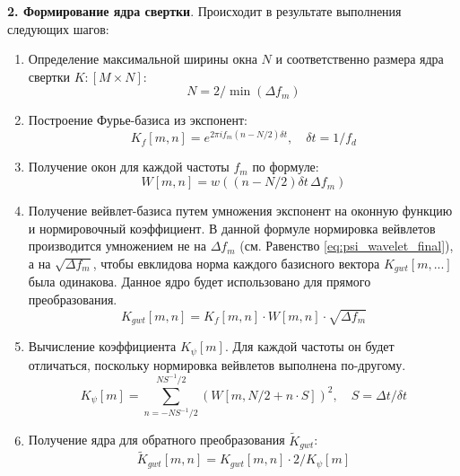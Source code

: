 \textbf{2. Формирование ядра свертки}. Происходит в результате выполнения следующих шагов:
\begin{enumerate}[1.]
  \item Определение максимальной ширины окна $N$ и соответственно размера ядра свертки $K: [M \times N]$:
  \begin{equation}
    N = 2 / \min(\Delta f_m)
  \end{equation}

  \item Построение Фурье-базиса из экспонент:
  \begin{equation}
    K_{f}[m, n] = e^{2\pi i f_m (n - N/2) \delta t}, \quad \delta t = 1 / f_d
  \end{equation}

  \item Получение окон для каждой частоты $f_m$ по формуле:
  \begin{equation}
    W[m, n] = w((n - N/2) \delta t \, \Delta f_m)
  \end{equation}

  \item Получение вейвлет-базиса путем умножения экспонент на оконную функцию и нормировочный коэффициент.
  В данной формуле нормировка вейвлетов производится умножением не на $\Delta f_m$ (см. Равенство \ref{eq:psi_wavelet_final}), 
  а на $\sqrt{\Delta f_m}$, чтобы евклидова норма каждого базисного вектора $K_{gwt}[m, ...]$ была одинакова.
  Данное ядро будет использовано для прямого преобразования.
  \begin{equation}
    K_{gwt}[m, n] = K_{f}[m, n] \cdot W[m, n] \cdot \sqrt{\Delta f_m} 
  \end{equation}

  \item Вычисление коэффициента $K_{\psi}[m]$. Для каждой частоты он будет отличаться, поскольку нормировка вейвлетов выполнена по-другому.
  \begin{equation}
    K_{\psi}[m] = \sum \limits_{n = -N S^{-1} / 2}^{N S^{-1} / 2}
      (W [m, N/2 + n \cdot S])^2 , \quad
    S = \Delta t / \delta t
  \end{equation}

  \item Получение ядра для обратного преобразования $\tilde{K}_{gwt}$:
  \begin{equation}
    \tilde{K}_{gwt}[m, n] = K_{gwt}[m, n] \cdot 2 / K_{\psi}[m]
  \end{equation}
\end{enumerate}

